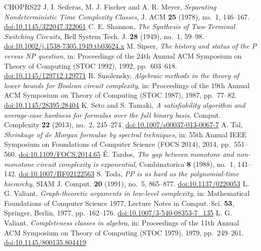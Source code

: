 \documentclass[11pt,reqno]{amsart}
\numberwithin{equation}{section}
\theoremstyle{plain}
\theoremstyle{definition}
\theoremstyle{remark}
\begin{document}
\begin{thebibliography}{CHOPRS22}
 J. I. Seiferas, M. J. Fischer and A. R. Meyer, \emph{Separating Nondeterministic Time Complexity Classes}, J. ACM \textbf{25} (1978), no.~1, 146--167. \href{https://doi.org/10.1145/322047.322061}{doi:10.1145/322047.322061}
 C. E. Shannon, \emph{The Synthesis of Two-Terminal Switching Circuits}, Bell System Tech. J. \textbf{28} (1949), no.~1, 59--98. \href{https://doi.org/10.1002/j.1538-7305.1949.tb03624.x}{doi:10.1002/j.1538-7305.1949.tb03624.x}
 M. Sipser, \emph{The history and status of the P versus NP question}, in: Proceedings of the 24th Annual ACM Symposium on Theory of Computing (STOC 1992), 1992, pp.~603--618. \href{https://doi.org/10.1145/129712.129771}{doi:10.1145/129712.129771}
 R. Smolensky, \emph{Algebraic methods in the theory of lower bounds for Boolean circuit complexity}, in: Proceedings of the 19th Annual ACM Symposium on Theory of Computing (STOC 1987), 1987, pp.~77--82. \href{https://doi.org/10.1145/28395.28404}{doi:10.1145/28395.28404}
 K. Seto and S. Tamaki, \emph{A satisfiability algorithm and average-case hardness for formulas over the full binary basis}, Comput. Complexity \textbf{22} (2013), no.~2, 245--274. \href{https://doi.org/10.1007/s00037-013-0067-7}{doi:10.1007/s00037-013-0067-7}
 A. Tal, \emph{Shrinkage of de Morgan formulae by spectral techniques}, in: 55th Annual IEEE Symposium on Foundations of Computer Science (FOCS 2014), 2014, pp.~551--560. \href{https://doi.org/10.1109/FOCS.2014.65}{doi:10.1109/FOCS.2014.65}
 {\'E}. Tardos, \emph{The gap between monotone and non-monotone circuit complexity is exponential}, Combinatorica \textbf{8} (1988), no.~1, 141--142. \href{https://doi.org/10.1007/BF02122563}{doi:10.1007/BF02122563}
 S. Toda, \emph{PP is as hard as the polynomial-time hierarchy}, SIAM J. Comput. \textbf{20} (1991), no.~5, 865--877. \href{https://doi.org/10.1137/0220053}{doi:10.1137/0220053}
 L. G. Valiant, \emph{Graph-theoretic arguments in low-level complexity}, in: Mathematical Foundations of Computer Science 1977, Lecture Notes in Comput. Sci. \textbf{53}, Springer, Berlin, 1977, pp.~162--176. \href{https://doi.org/10.1007/3-540-08353-7_135}{doi:10.1007/3-540-08353-7\_135}
 L. G. Valiant, \emph{Completeness classes in algebra}, in: Proceedings of the 11th Annual ACM Symposium on Theory of Computing (STOC 1979), 1979, pp.~249--261. \href{https://doi.org/10.1145/800135.804419}{doi:10.1145/800135.804419}

\end{thebibliography}
\end{document}
